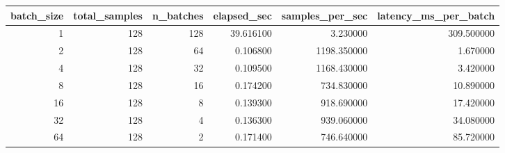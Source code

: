 \begin{tabular}{rrrrrr}
\toprule
batch\_size & total\_samples & n\_batches & elapsed\_sec & samples\_per\_sec & latency\_ms\_per\_batch \\
\midrule
1 & 128 & 128 & 39.616100 & 3.230000 & 309.500000 \\
2 & 128 & 64 & 0.106800 & 1198.350000 & 1.670000 \\
4 & 128 & 32 & 0.109500 & 1168.430000 & 3.420000 \\
8 & 128 & 16 & 0.174200 & 734.830000 & 10.890000 \\
16 & 128 & 8 & 0.139300 & 918.690000 & 17.420000 \\
32 & 128 & 4 & 0.136300 & 939.060000 & 34.080000 \\
64 & 128 & 2 & 0.171400 & 746.640000 & 85.720000 \\
\bottomrule
\end{tabular}
